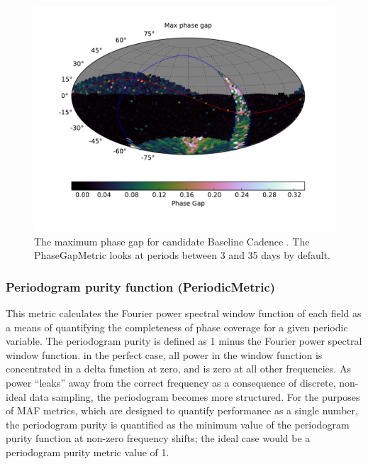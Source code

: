\begin{figure}[tbh!]
\includegraphics{figs/variables/enigma_1189_Phase_Gap_LargestGap_OPSI_SkyMap.pdf}
\caption{The maximum phase gap for candidate Baseline Cadence .
The PhaseGapMetric looks at periods between 3 and 35 days by default.}
\label{fig:enigmaMaxGap}
\end{figure}

\subsubsection{Periodogram purity function (PeriodicMetric)}
This metric calculates the Fourier power spectral window function of each field
\citep{1987AJ.....93..968R} as a means of quantifying the completeness of phase
coverage for a given periodic variable. The periodogram purity is defined as 1
minus the Fourier power spectral window function. in the perfect case, all
power in the window function is concentrated in a delta function at zero, and
is zero at all other frequencies. As power ``leaks'' away from the correct
frequency as a consequence of discrete, non-ideal data sampling, the
periodogram becomes more structured. For the purposes of MAF metrics, which are
designed to quantify performance as a single number, the periodogram purity is
quantified as the minimum value of the periodogram purity function at non-zero
frequency shifts; the ideal case would be a periodogram purity metric value of
1.

